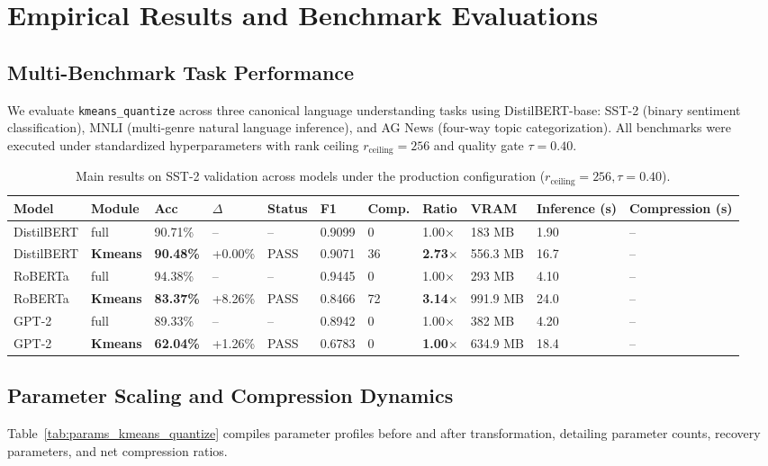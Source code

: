 \section{Empirical Results and Benchmark Evaluations}
\label{sec:results}

\subsection{Multi-Benchmark Task Performance}
We evaluate \texttt{kmeans\_quantize} across three canonical language understanding tasks using DistilBERT-base: SST-2 (binary sentiment classification), MNLI (multi-genre natural language inference), and AG News (four-way topic categorization). All benchmarks were executed under standardized hyperparameters with rank ceiling $r_{\mathrm{ceiling}} = 256$ and quality gate $\tau = 0.40$.

\begin{table}[t]
\centering
\small
\begin{tabular}{lllllllllll}
\toprule
\textbf{Model} & \textbf{Module} & \textbf{Acc} & \textbf{$\Delta$} & \textbf{Status} & \textbf{F1} & \textbf{Comp.} & \textbf{Ratio} & \textbf{VRAM} & \textbf{Inference (s)} & \textbf{Compression (s)} \\
\midrule
DistilBERT & full & 90.71\% & -- & -- & 0.9099 & 0 & 1.00$\times$ & 183 MB & 1.90 & -- \\
DistilBERT & \textbf{Kmeans} & \textbf{90.48\%} & +0.00\% & PASS & 0.9071 & 36 & \textbf{2.73$\times$} & 556.3 MB & 16.7 & -- \\
RoBERTa & full & 94.38\% & -- & -- & 0.9445 & 0 & 1.00$\times$ & 293 MB & 4.10 & -- \\
RoBERTa & \textbf{Kmeans} & \textbf{83.37\%} & +8.26\% & PASS & 0.8466 & 72 & \textbf{3.14$\times$} & 991.9 MB & 24.0 & -- \\
GPT-2 & full & 89.33\% & -- & -- & 0.8942 & 0 & 1.00$\times$ & 382 MB & 4.20 & -- \\
GPT-2 & \textbf{Kmeans} & \textbf{62.04\%} & +1.26\% & PASS & 0.6783 & 0 & \textbf{1.00$\times$} & 634.9 MB & 18.4 & -- \\
\bottomrule
\end{tabular}
\caption{Main results on SST-2 validation across models under the production configuration ($r_{\mathrm{ceiling}}=256, \tau=0.40$).}
\label{tab:main_sst2}
\end{table}

\subsection{Parameter Scaling and Compression Dynamics}
Table~\ref{tab:params_kmeans_quantize} compiles parameter profiles before and after transformation, detailing parameter counts, recovery parameters, and net compression ratios.

